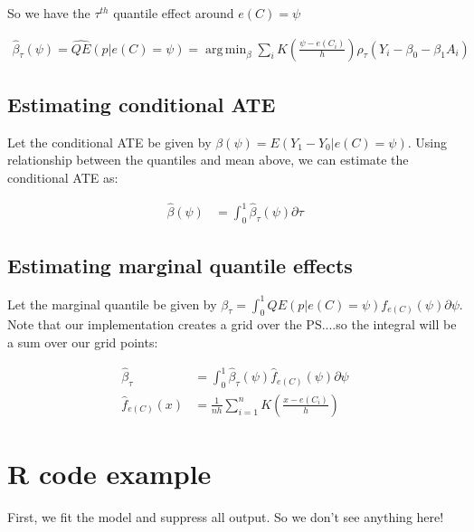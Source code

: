 \documentclass{article}\usepackage[]{graphicx}\usepackage[]{color}
\DeclareMathOperator*{\argmin}{arg\,min}
\def\betahat{{\widehat\beta}}
\begin{document}
So we have the $\tau^{th}$ quantile effect around $e(C)=\psi$

\begin{align*}
  \betahat_\tau(\psi) = \widehat{QE}(p|e(C)=\psi) = \argmin_\beta \sum_i K\left( \frac{\psi-e(C_i)}{h}\right) \rho_\tau( Y_i - \beta_0 - \beta_1 A_i)
\end{align*}

\subsection{Estimating conditional ATE}

Let the conditional ATE be given by $ \beta(\psi) = E(Y_1-Y_0|e(C)=\psi)$. Using relationship between the quantiles and mean above, we can estimate the conditional ATE as:

\begin{align*}
   \betahat(\psi) &= \int_0^1 \betahat_\tau(\psi) \partial \tau
\end{align*}

\subsection{Estimating marginal quantile effects}

Let the marginal quantile be given by $ \beta_\tau = \int_0^1 QE(p|e(C)=\psi) f_{e(C)}(\psi) \partial \psi$. Note that our implementation creates a grid over the PS....so the integral will be a sum over our grid points:

\begin{align*}
   \betahat_\tau &=  \int_0^1 \betahat_\tau(\psi) \widehat{f}_{e(C)}(\psi) \partial \psi \\
   \widehat{f}_{e(C)}(x) &= \frac{1}{nh} \sum_{i=1}^n K\left( \frac{x-e(C_i)}{h}\right)
\end{align*}



\section{R code example}

First, we fit the model and suppress all output. So we don't see anything here!
\end{document}
